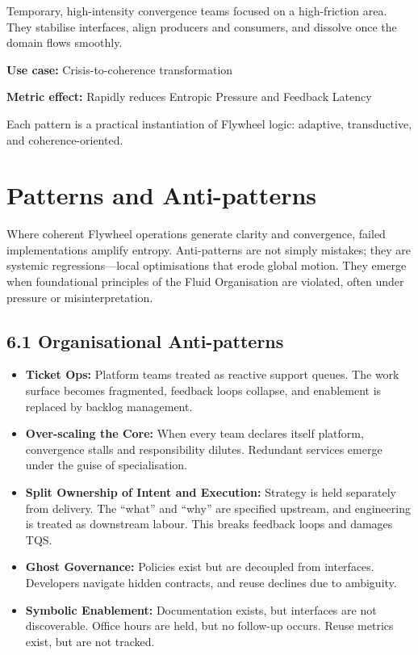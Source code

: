 \documentclass[12pt]{article}
\begin{document}
Temporary, high-intensity convergence teams focused on a high-friction area. They stabilise interfaces, align producers and consumers, and dissolve once the domain flows smoothly.

\textbf{Use case:} Crisis-to-coherence transformation

\textbf{Metric effect:} Rapidly reduces Entropic Pressure and Feedback Latency

\vspace{1em}
Each pattern is a practical instantiation of Flywheel logic: adaptive, transductive, and coherence-oriented.

\section{Patterns and Anti-patterns}

Where coherent Flywheel operations generate clarity and convergence, failed implementations amplify entropy. Anti-patterns are not simply mistakes; they are systemic regressions---local optimisations that erode global motion. They emerge when foundational principles of the Fluid Organisation are violated, often under pressure or misinterpretation.

\subsection*{6.1 Organisational Anti-patterns}

\begin{itemize}
    \item \textbf{Ticket Ops:} Platform teams treated as reactive support queues. The work surface becomes fragmented, feedback loops collapse, and enablement is replaced by backlog management.
    
    \item \textbf{Over-scaling the Core:} When every team declares itself platform, convergence stalls and responsibility dilutes. Redundant services emerge under the guise of specialisation.
    
    \item \textbf{Split Ownership of Intent and Execution:} Strategy is held separately from delivery. The “what” and “why” are specified upstream, and engineering is treated as downstream labour. This breaks feedback loops and damages TQS.
    
    \item \textbf{Ghost Governance:} Policies exist but are decoupled from interfaces. Developers navigate hidden contracts, and reuse declines due to ambiguity.
    
    \item \textbf{Symbolic Enablement:} Documentation exists, but interfaces are not discoverable. Office hours are held, but no follow-up occurs. Reuse metrics exist, but are not tracked.
\end{itemize}
\end{document}
